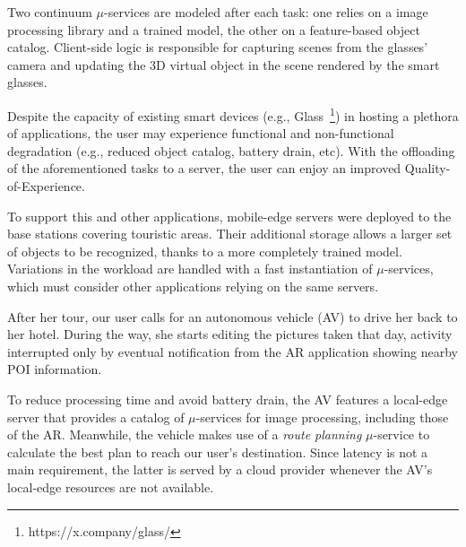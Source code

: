 Two continuum $\mu$-services are modeled after each task: one relies on a image processing library and a trained model, the other on a feature-based object catalog. Client-side logic is responsible for capturing scenes from the glasses' camera and updating the 3D virtual object in the scene rendered by the smart glasses.

Despite the capacity of existing smart devices (e.g., Glass~\footnote{https://x.company/glass/}) in hosting a plethora of applications, the user may experience functional and non-functional degradation (e.g., reduced object catalog, battery drain, etc). With the offloading of the aforementioned tasks to a server, the user can enjoy an improved Quality-of-Experience.


To support this and other applications, mobile-edge servers were deployed to the base stations covering touristic areas. Their additional storage allows a larger set of objects to be recognized, thanks to a more completely trained model. Variations in the workload are handled with a fast instantiation of $\mu$-services, which must consider other applications relying on the same servers.


After her tour, our user calls for an autonomous vehicle (AV) to drive her back to her hotel. During the way, she starts editing the pictures taken that day, activity interrupted only by eventual notification from the AR application showing nearby POI information. 

To reduce processing time and avoid battery drain, the AV features a local-edge server that provides a catalog of $\mu$-services for image processing, including those of the AR. Meanwhile, the vehicle makes use of a \textit{route planning} $\mu$-service
to calculate the best plan to reach our user's destination. Since latency is not a main requirement, the latter is served by a cloud provider whenever the AV's local-edge resources are not available. 


